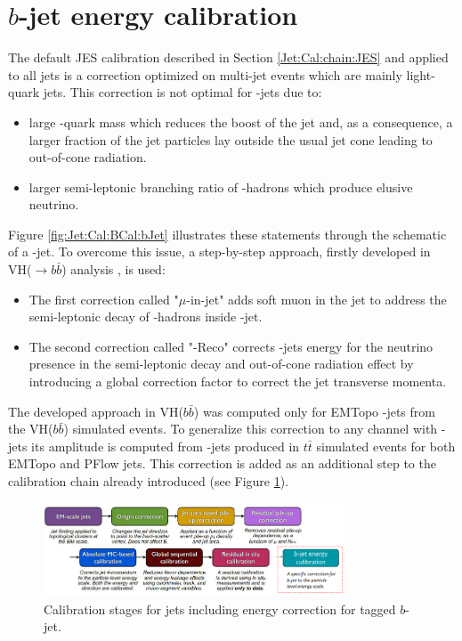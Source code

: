 \section{$b$-jet energy calibration}
\label{Jet:Cal:BCal}
The default JES calibration described in Section \ref{Jet:Cal:chain:JES} and applied to all jets is a correction optimized on multi-jet events which are mainly light-quark jets. This correction is not optimal for \bq-jets due to:
\begin{itemize}
    \item large \bq-quark mass which reduces the boost of the jet and, as a consequence, a larger fraction of the jet particles lay outside the usual jet cone leading to out-of-cone radiation.
    \item larger semi-leptonic branching ratio of \bq-hadrons which produce elusive neutrino.
\end{itemize}
Figure \ref{fig:Jet:Cal:BCal:bJet} illustrates these statements through the schematic of a \bq-jet. To overcome this issue, a step-by-step approach, firstly developed in VH($\rightarrow b\bar{b}$) analysis \cite{Vhbb}, is used:
\begin{itemize}
    \item The first correction called "$\mu$-in-jet" adds soft muon in the jet to address the semi-leptonic decay of \bq-hadrons inside \bq-jet.
    \item The second correction called "\pT-Reco" corrects \bq-jets energy for the neutrino presence in the semi-leptonic decay and out-of-cone radiation effect by introducing a global correction factor to correct the jet transverse momenta.
\end{itemize}
 The developed approach in VH($b\bar{b}$) was computed only for EMTopo \bq-jets from the VH($b\bar{b}$) simulated events. To generalize this correction to any channel with \bq-jets its amplitude is computed from \bq-jets produced in $t\bar{t}$ simulated events for both EMTopo and PFlow jets. This correction is added as an additional step to the calibration chain already introduced (see Figure \ref{fig:Jet:Cal:BCal:Chain}).
\begin{figure}[htbp]
    \centering
    \includegraphics[width=0.8\textwidth]{Ch4/Img/b_jet_chain.png}
    \begin{tcolorbox}[colback=black!5!white,colframe=white!75!black]
    \caption{Calibration stages for jets including energy correction for tagged $b$-jet.}
    \label{fig:Jet:Cal:BCal:Chain}
    \end{tcolorbox}
\end{figure}
